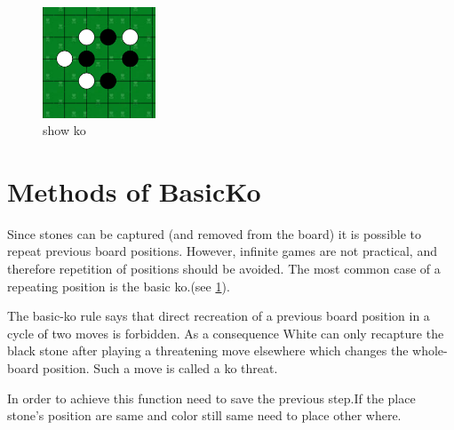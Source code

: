 \documentclass[a4,10pt]{article}
\begin{document}
        \begin{figure}[tbp]
         \centering
        \includegraphics[width=0.30\textwidth]{gfx/ko.png}
        \caption{show ko  }
        \label{fig:ko}
        \end{figure}
  \section{Methods of BasicKo}
  Since stones can be captured (and removed from the board) it is possible to repeat previous board positions.
  However, infinite games are not practical, and therefore repetition of positions should be avoided.
  The most common case of a repeating position is the basic ko.\cite{werf:2003}(see \cref{fig:ko}).

The basic-ko rule says that direct recreation of a previous board position in a cycle of two moves is forbidden.
As a consequence White can only recapture the black stone after playing a threatening move elsewhere which changes the whole-board position. Such a move is called a ko threat.

In order to achieve this function need to save the previous step.If the place stone's position are same and color still same need
to place other where.

\end{document}
